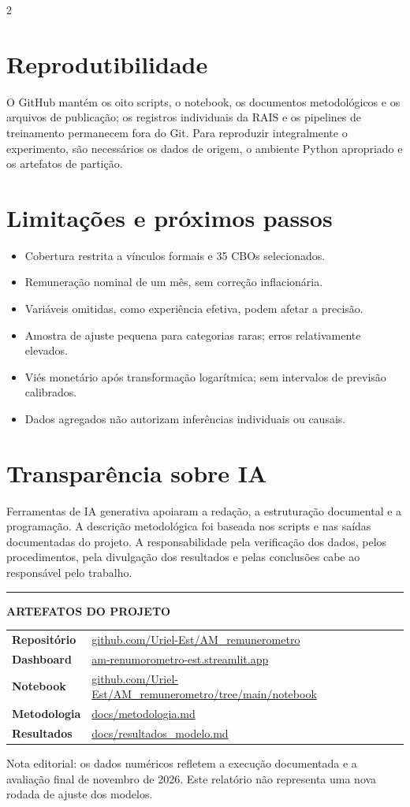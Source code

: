 \documentclass[10pt,a4paper]{article}
\newcommand{\finenote}[1]{{\sffamily\fontsize{7.5}{10}\selectfont\color{slate}#1\par}}
\newcommand{\sourceurl}{\href{https://github.com/Uriel-Est/AM_remunerometro}{github.com/Uriel-Est/AM\_remunerometro}}
\newcommand{\dashurl}{\href{https://am-renumorometro-est.streamlit.app/}{am-renumorometro-est.streamlit.app}}
\begin{document}
\begin{multicols}{2}
\section{Reprodutibilidade}
O GitHub mantém os oito scripts, o notebook, os documentos metodológicos e os arquivos de publicação; os registros individuais da RAIS e os pipelines de treinamento permanecem fora do Git. Para reproduzir integralmente o experimento, são necessários os dados de origem, o ambiente Python apropriado e os artefatos de partição.

\section{Limitações e próximos passos}
\begin{itemize}
\item Cobertura restrita a vínculos formais e 35 CBOs selecionados.
\item Remuneração nominal de um mês, sem correção inflacionária.
\item Variáveis omitidas, como experiência efetiva, podem afetar a precisão.
\item Amostra de ajuste pequena para categorias raras; erros relativamente elevados.
\item Viés monetário após transformação logarítmica; sem intervalos de previsão calibrados.
\item Dados agregados não autorizam inferências individuais ou causais.
\end{itemize}

\section{Transparência sobre IA}
Ferramentas de IA generativa apoiaram a redação, a estruturação documental e a programação. A descrição metodológica foi baseada nos scripts e nas saídas documentadas do projeto. A responsabilidade pela verificação dos dados, pelos procedimentos, pela divulgação dos resultados e pelas conclusões cabe ao responsável pelo trabalho.
\end{multicols}
\vspace{3mm}
{\color{hairline}\rule{\linewidth}{.6pt}}\vspace{2mm}
{\sffamily\fontsize{9}{12}\selectfont\color{navy}\textbf{ARTEFATOS DO PROJETO}}\par\vspace{2mm}
\noindent\begin{tabularx}{\linewidth}{@{}p{28mm}X@{}}
\textbf{Repositório} & \sourceurl\\
\textbf{Dashboard} & \dashurl\\
\textbf{Notebook} & \href{https://github.com/Uriel-Est/AM_remunerometro/tree/main/notebook}{github.com/Uriel-Est/AM\_remunerometro/tree/main/notebook}\\
\textbf{Metodologia} & \href{https://github.com/Uriel-Est/AM_remunerometro/blob/main/docs/metodologia.md}{docs/metodologia.md}\\
\textbf{Resultados} & \href{https://github.com/Uriel-Est/AM_remunerometro/blob/main/docs/resultados_modelo.md}{docs/resultados\_modelo.md}\\
\end{tabularx}
\vspace{2mm}
\finenote{Nota editorial: os dados numéricos refletem a execução documentada e a avaliação final de novembro de 2026. Este relatório não representa uma nova rodada de ajuste dos modelos.}
\end{document}
